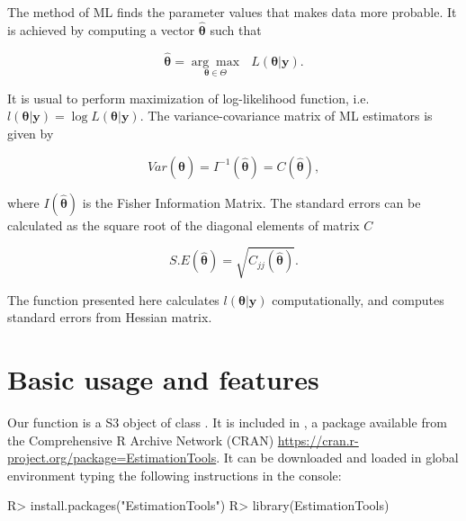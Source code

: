 \documentclass[nojss]{jss}
\begin{document}
The method of ML finds the parameter values that makes data more probable. It is achieved by computing a vector $\boldsymbol{\hat{\theta}}$ such that

\begin{equation} \label{maxim}
\hat{\boldsymbol{\theta}} = \underset{\bm{\theta} \in \Theta}{\arg\max} \text{ } L(\boldsymbol{\theta}|\bm{y}).
\end{equation}

It is usual to perform maximization of log-likelihood function, i.e. $l(\boldsymbol{\theta}|\bm{y})=\log L(\boldsymbol{\theta}|\bm{y})$. The variance-covariance matrix of ML estimators is given by

\begin{equation}
Var(\hat{\boldsymbol{\theta}}) = I^{-1}(\hat{\boldsymbol{\theta}}) = C(\hat{\boldsymbol{\theta}}),
\end{equation}

where $I(\hat{\boldsymbol{\theta}})$ is the Fisher Information Matrix. The standard errors can be calculated as the square root of the diagonal elements of matrix $C$ \citep{Pawitan2013}%

\begin{equation}
S.E(\hat{\boldsymbol{\theta}}) = \sqrt{C_{jj}(\hat{\boldsymbol{\theta}})}.
\end{equation}

The  function presented here calculates $l(\boldsymbol{\theta}|\bm{y})$ computationally, and computes standard errors from Hessian matrix.

\section{Basic usage and features}

Our  function is a S3 object of class . It is included in , a package available from the Comprehensive R Archive Network (CRAN) \url{https://cran.r-project.org/package=EstimationTools}. It can be downloaded and loaded in global environment typing the following instructions in the console:

\begin{Schunk}
\begin{Sinput}
R> install.packages("EstimationTools")
R> library(EstimationTools)
\end{Sinput}
\end{Schunk}
\end{document}
